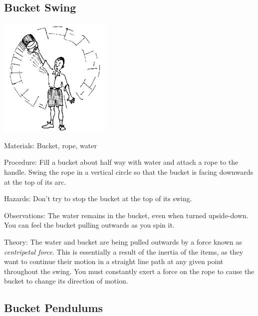\begin{multicols}{2}
\subsection{Bucket Swing}

\begin{center}
\includegraphics[width=0.4\textwidth]{./img/source/bucket-swing.png}
\end{center}

\begin{description*}
\item[Materials:]{Bucket, rope, water}
\item[Procedure:]{Fill a bucket about half way with water and attach a rope to the handle. Swing the rope in a vertical circle so that the bucket is facing downwards at the top of its arc.}
\item[Hazards:]{Don't try to stop the bucket at the top of its swing.}
\item[Observations:]{The water remains in the bucket, even when turned upside-down. You can feel the bucket pulling outwards as you spin it.}
\item[Theory:]{The water and bucket are being pulled outwards by a force known as \emph{centripetal force}. This is essentially a result of the inertia of the items, as they want to continue their motion in a straight line path at any given point throughout the swing. You must constantly exert a force on the rope to cause the bucket to change its direction of motion.}
\end{description*}

\subsection{Bucket Pendulums}


\end{multicols}

